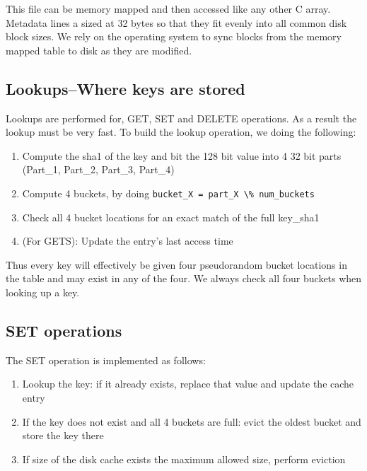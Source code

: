 \documentclass{article}
\begin{document}
This file can be memory mapped and then accessed like any other C array. Metadata lines a sized at 32 bytes so that they fit evenly into all common disk block sizes. We rely on the operating system to sync blocks from the memory mapped table to disk as they are modified. \\


\subsection{Lookups--Where keys are stored}
Lookups are performed for, GET, SET and DELETE operations. As a result the lookup must be very fast. To build the lookup operation, we doing the following:
\begin{enumerate}
\item Compute the sha1 of the key and bit the 128 bit value into 4 32 bit parts (Part\_1, Part\_2, Part\_3, Part\_4)
\item Compute 4 buckets, by doing \verb|bucket_X = part_X \% num_buckets|
\item Check all 4 bucket locations for an exact match of the full key\_sha1
\item (For GETS): Update the entry's last access time
\end{enumerate}

Thus every key will effectively be given four pseudorandom bucket locations in the table and may exist in any of the four. We always check all four buckets when looking up a key. 

\subsection{SET operations}
The SET operation is implemented as follows: 
\begin{enumerate}
\item Lookup the key: if it already exists, replace that value and update the cache entry
\item If the key does not exist and all 4 buckets are full: evict the oldest bucket and store the key there
\item If size of the disk cache exists the maximum allowed size, perform eviction
\end{enumerate}
\end{document}
